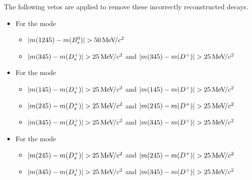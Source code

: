 The following vetos are applied to remove these incorrectly reconstructed decays.
\begin{itemize}
\item For the mode \decay{\Bp}{(\decay{\Dsp}{\Kp\Km\pip})\phiz}
\begin{itemize}
\item $|m(\text{1245})- m({{B}^0_{s}})| > 50{\mathrm{\,Me\kern -0.1em V\!/}c^2}$
\item $|m(\text{345})- m({{D}^+_{s}})| > 25{\mathrm{\,Me\kern -0.1em V\!/}c^2}$ and $|m(\text{345})- m({{D}^+})| > 25{\mathrm{\,Me\kern -0.1em V\!/}c^2}$
\end{itemize}

\item For the mode \decay{\Bp}{(\decay{\Dsp}{\pip\pim\pip})\phiz}
\begin{itemize}
\item $|m(\text{145})- m({{D}^+_{s}})| > 25{\mathrm{\,Me\kern -0.1em V\!/}c^2}$ and $|m(\text{145})- m({{D}^+})| > 25{\mathrm{\,Me\kern -0.1em V\!/}c^2}$
\item $|m(\text{245})- m({{D}^+_{s}})| > 25{\mathrm{\,Me\kern -0.1em V\!/}c^2}$ and $|m(\text{245})- m({{D}^+})| > 25{\mathrm{\,Me\kern -0.1em V\!/}c^2}$
\item $|m(\text{345})- m({{D}^+_{s}})| > 25{\mathrm{\,Me\kern -0.1em V\!/}c^2}$ and $|m(\text{345})- m({{D}^+})| > 25{\mathrm{\,Me\kern -0.1em V\!/}c^2}$
\end{itemize}
\item For the mode \decay{\Bp}{(\decay{\Dsp}{\Kp\pim\pip})\phiz}
\begin{itemize}
\item $|m(\text{245})- m({{D}^+_{s}})| > 25{\mathrm{\,Me\kern -0.1em V\!/}c^2}$ and $|m(\text{245})- m({{D}^+})| > 25{\mathrm{\,Me\kern -0.1em V\!/}c^2}$
\item $|m(\text{345})- m({{D}^+_{s}})| > 25{\mathrm{\,Me\kern -0.1em V\!/}c^2}$ and $|m(\text{345})- m({{D}^+})| > 25{\mathrm{\,Me\kern -0.1em V\!/}c^2}$
\end{itemize}
\end{itemize}

